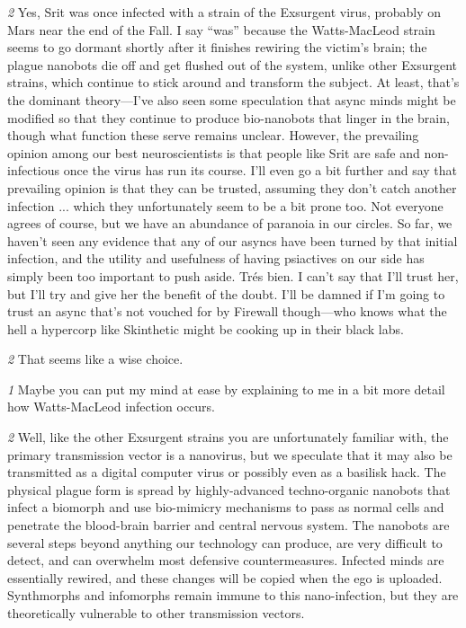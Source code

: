 \textit{\textit{2}} Yes, Srit was once infected with a strain of the Exsurgent virus, probably on Mars near the end of the Fall. I say “was” because the Watts-MacLeod strain seems to go dormant shortly after it finishes rewiring the victim’s brain; the plague nanobots die off and get flushed out of the system, unlike other Exsurgent strains, which continue to stick around and transform the subject. At least, that’s the dominant theory—I’ve also seen some speculation that async minds might be modified so that they continue to produce bio-nanobots that linger in the brain, though what function these serve remains unclear. However, the prevailing opinion among our best neuroscientists is that people like Srit are safe and non-infectious once the virus has run its course. I’ll even go a bit further and say that prevailing opinion is that they can be trusted, assuming they don’t catch another infection ... which they unfortunately seem to be a bit prone too. Not everyone agrees of course, but we have an abundance of paranoia in our circles. So far, we haven’t seen any evidence that any of our asyncs have been turned by that initial infection, and the utility and usefulness of having psiactives on our side has simply been too important to push aside. Trés bien. I can’t say that I’ll trust her, but I’ll try and give her the benefit of the doubt. I’ll be damned if I’m going to trust an async that’s not vouched for by Firewall though—who knows what the hell a hypercorp like Skinthetic might be cooking up in their black labs. 

\textit{\textit{2}} That seems like a wise choice. 

\textit{\textit{1}} Maybe you can put my mind at ease by explaining to me in a bit more detail how Watts-MacLeod infection occurs. 

\textit{\textit{2}} Well, like the other Exsurgent strains you are unfortunately familiar with, the primary transmission vector is a nanovirus, but we speculate that it may also be transmitted as a digital computer virus or possibly even as a basilisk hack. The physical plague form is spread by highly-advanced techno-organic nanobots that infect a biomorph and use bio-mimicry mechanisms to pass as normal cells and penetrate the blood-brain barrier and central nervous system. The nanobots are several steps beyond anything our technology can produce, are very difficult to detect, and can overwhelm most defensive countermeasures. Infected minds are essentially rewired, and these changes will be copied when the ego is uploaded. Synthmorphs and infomorphs remain immune to this nano-infection, but they are theoretically vulnerable to other transmission vectors. 

